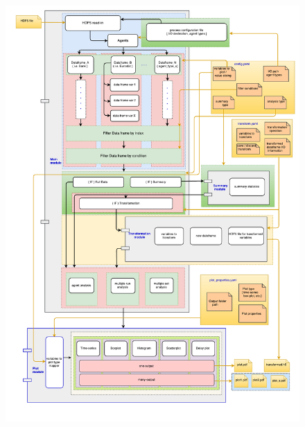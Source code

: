 \documentclass[9pt,sansserif]{beamer}
\begin{document}
\begin{frame}{}\small
\vspace{-1cm}
\thispagestyle{empty}

\begin{figure}[hb!]
\centering\leavevmode
\graphicspath{{./png/}}
%
\hspace{-4cm}
\begin{minipage}{10cm}
\centering\leavevmode
\includegraphics[scale=0.45]{flame_pandas_workflow_diagram.pdf}
\end{minipage}
\end{figure}

\end{frame}
\end{document}
